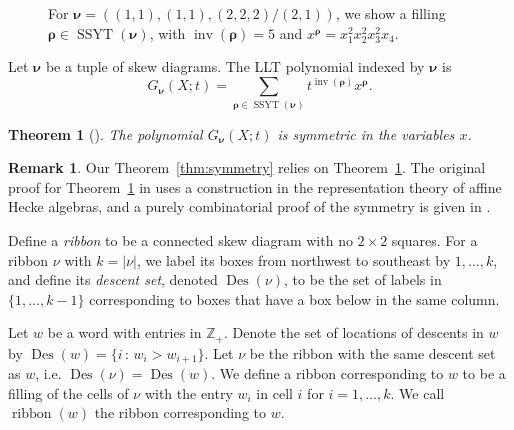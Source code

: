 \documentclass[11pt]{article}
\newtheorem{theorem}[theo]{Theorem}
\theoremstyle{definition}
\newtheorem{remark}[theo]{Remark}
\numberwithin{equation}{section}
\DeclareMathOperator{\inv}{inv}
\DeclareMathOperator{\Des}{Des}
\DeclareMathOperator{\ribbon}{ribbon}
\DeclareMathOperator{\SSYT}{SSYT}
\newlength\cellsize \setlength\cellsize{12\unitlength}
\newcommand\cellify[1]{\def\thearg{#1}\def\nothing{}%
\ifx\thearg\nothing
\vrule width0pt height\cellsize depth0pt\else
\hbox to 0pt{\usebox2\hss}\fi%
\vbox to 12\unitlength{
\vss
\hbox to 12\unitlength{\hss$#1$\hss}
\vss}}
\newcommand\tableau[1]{\vtop{\let\\=\cr
\setlength\baselineskip{-16000pt}
\setlength\lineskiplimit{16000pt}
\setlength\lineskip{0pt}
\halign{&\cellify{##}\cr#1\crcr}}}
\begin{document}
\begin{figure}[h]
\centering
{}
\caption{For $\boldsymbol{\nu}=((1,1),(1,1),(2,2,2)/(2,1))$, we show a filling $\boldsymbol{\rho}\in\SSYT(\boldsymbol{\nu})$, with $\inv(\boldsymbol{\rho})=5$ and $x^{\boldsymbol{\rho}}=x_1^2x_2^2x_3^2x_4$.}
\label{fig:LLT1}
\end{figure}


\begin{defn}\label{def:LLT}
Let $\boldsymbol{\nu}$ be a tuple of skew diagrams. The LLT polynomial indexed by $\boldsymbol{\nu}$ is
\[
G_{\boldsymbol{\nu}}(X;t) = \sum_{\boldsymbol{\rho}\in\SSYT(\boldsymbol{\nu})} t^{\inv(\boldsymbol{\rho})}x^{\boldsymbol{\rho}}.
\]

\end{defn}
\begin{theorem}[\cite{LLT,LLT2}]\label{thm:LLT} 
The polynomial $G_{\boldsymbol{\nu}}(X;t)$ is symmetric in the variables $x$.
\end{theorem}
\begin{remark} Our Theorem~\ref{thm:symmetry} relies on Theorem~\ref{thm:LLT}. The original proof for Theorem~\ref{thm:LLT} in \cite{LLT} uses a construction in the representation theory of affine Hecke algebras, and a purely combinatorial proof of the symmetry is given in \cite[Section 10: Appendix]{HHL05}.
\end{remark}

\begin{defn}\label{def:ribbon}
Define a \emph{ribbon} to be a connected skew diagram with no $2\times2$ squares. For a ribbon $\nu$ with $k=|\nu|$, we label its boxes from northwest to southeast by $1,\ldots,k$, and define its
{\em descent set}, denoted $\Des(\nu)$, to be the set of labels in $\{1,\ldots,k-1\}$ corresponding to boxes that have a box below in the same column.

Let $w$ be a word with entries in $\mathbb{Z}_+$. Denote the set of locations of descents in $w$ by $\Des(w) = \{i\,:\,w_i>w_{i+1}\}$. Let $\nu$ be the ribbon with the same descent set as $w$, i.e. $\Des(\nu)=\Des(w)$. We define a ribbon corresponding to $w$ to be a filling of the cells of $\nu$ with the entry $w_i$ in cell $i$ for $i=1,\ldots,k$. We call $\ribbon(w)$ the ribbon corresponding to $w$. 
\end{defn}
\end{document}
